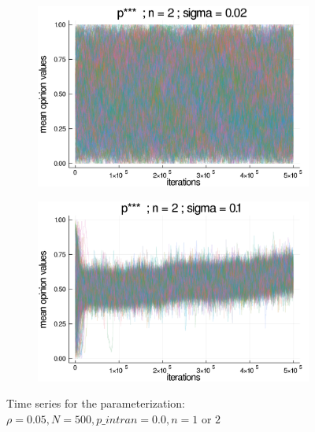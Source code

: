 \documentclass{article}
\begin{document}
\begin{figure}[H]
\begin{subfigure}[b]{0.48\textwidth}
    \end{subfigure}     
              \begin{subfigure}[b]{0.48\textwidth}
      \includegraphics[width=\textwidth]{img/series/tseries1/Poodlcalculatep***n2-rho005-sigma002-00intransrandom.png}
     \end{subfigure}
    \begin{subfigure}[b]{0.48\textwidth}
      \includegraphics[width=\textwidth]{img/series/tseries1/Poodlcalculatep***n2-rho005-sigma01-00intransrandom.png}
    \end{subfigure}
     \caption{Time series for the parameterization: \(\rho = 0.05, N = 500,
       p\_intran = 0.0, n  = 1 \) or  $2$}
      \label{fig:tseries1}
    \end{figure}
\end{document}

